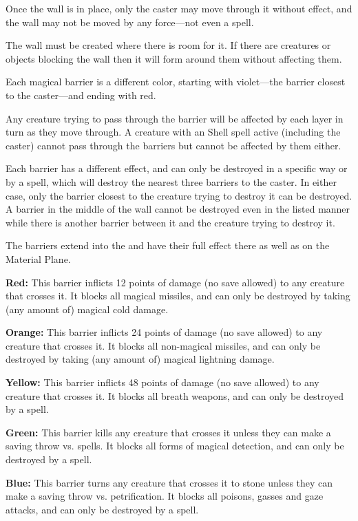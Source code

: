 \begin{multicols*}{2}
Once the wall is in place, only the caster may move through it without effect, and the wall may not be moved by any force—not even a  spell.

The wall must be created where there is room for it. If there are creatures or objects blocking the wall then it will form around them without affecting them.

Each magical barrier is a different color, starting with violet—the barrier closest to the caster—and ending with red.

Any creature trying to pass through the barrier will be affected by each layer in turn as they move through. A creature with an  Shell spell active (including the caster) cannot pass through the barriers but cannot be affected by them either.

Each barrier has a different effect, and can only be destroyed in a specific way or by a  spell, which will destroy the nearest three barriers to the caster. In either case, only the barrier closest to the creature trying to destroy it can be destroyed. A barrier in the middle of the wall cannot be destroyed even in the listed manner while there is another barrier between it and the creature trying to destroy it.

The barriers extend into the  and have their full effect there as well as on the Material Plane.

\textbf{Red:} This barrier inflicts 12 points of damage (no save allowed) to any creature that crosses it. It blocks all magical missiles, and can only be destroyed by taking (any amount of) magical cold damage.

\textbf{Orange:} This barrier inflicts 24 points of damage (no save allowed) to any creature that crosses it. It blocks all non-magical missiles, and can only be destroyed by taking (any amount of) magical lightning damage.

\textbf{Yellow:} This barrier inflicts 48 points of damage (no save allowed) to any creature that crosses it. It blocks all breath weapons, and can only be destroyed by a  spell.

\textbf{Green:} This barrier kills any creature that crosses it unless they can make a saving throw vs. spells. It blocks all forms of magical detection, and can only be destroyed by a  spell.

\textbf{Blue:} This barrier turns any creature that crosses it to stone unless they can make a saving throw vs. petrification. It blocks all poisons, gasses and gaze attacks, and can only be destroyed by a  spell.


\end{multicols*}
